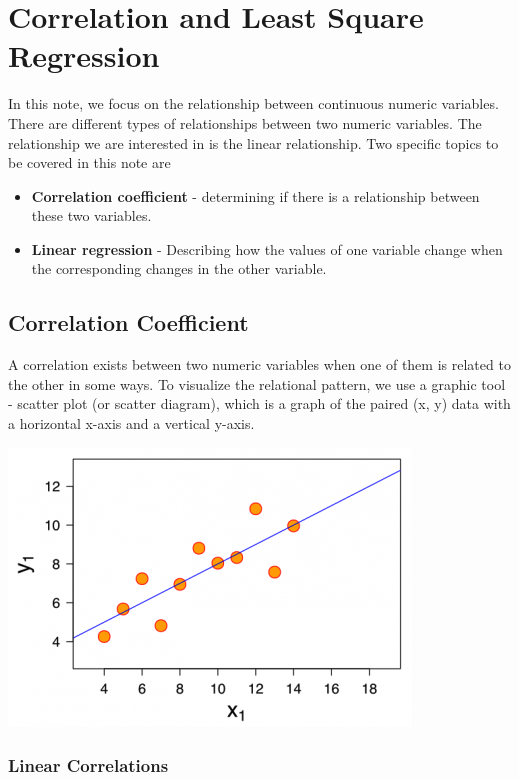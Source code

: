 \documentclass[
]{book}
\begin{document}
\hypertarget{correlation-and-least-square-regression}{%
\chapter{Correlation and Least Square Regression}\label{correlation-and-least-square-regression}}

\hfill\break
In this note, we focus on the relationship between continuous numeric variables. There are different types of relationships between two numeric variables. The relationship we are interested in is the linear relationship. Two specific topics to be covered in this note are

\begin{itemize}
\item
  \textbf{Correlation coefficient} - determining if there is a relationship between these two variables.
\item
  \textbf{Linear regression} - Describing how the values of one variable change when the corresponding changes in the other variable.
\end{itemize}

\hfill\break

\hypertarget{correlation-coefficient}{%
\section{Correlation Coefficient}\label{correlation-coefficient}}

\hfill\break

A correlation exists between two numeric variables when one of them is related to the other in some ways. To visualize the relational pattern, we use a graphic tool - scatter plot (or scatter diagram), which is a graph of the paired (x, y) data with a horizontal x-axis and a vertical y-axis.

\hfill\break

\begin{center}\includegraphics[width=0.4\linewidth]{week12/scatterPlot} \end{center}

\hypertarget{linear-correlations}{%
\subsection{Linear Correlations}\label{linear-correlations}}
\end{document}
